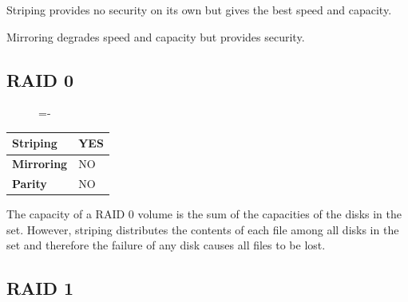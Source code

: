 \documentclass[a4paper]{systems-software}
\begin{document}
Striping provides no security on its own but gives the best speed and capacity.

Mirroring degrades speed and capacity but provides security.


\subsection*{RAID 0}

\begin{figure}[H]
  \lineskip=-\fboxrule
\end{figure}

\begin{longtabu} to \textwidth {| X[1,l] | X[6,l] |}
    \hline
    \textbf{Striping} & YES
	\\ \hline
	\textbf{Mirroring} & NO
	\\ \hline
	\textbf{Parity} & NO
	\\ \hline
\end{longtabu}

The capacity of a RAID 0 volume is the sum of the capacities of the disks in the set. However, striping distributes the contents of each file among all disks in the set and therefore the failure of any disk causes all files to be lost.


\subsection*{RAID 1}
\end{document}
